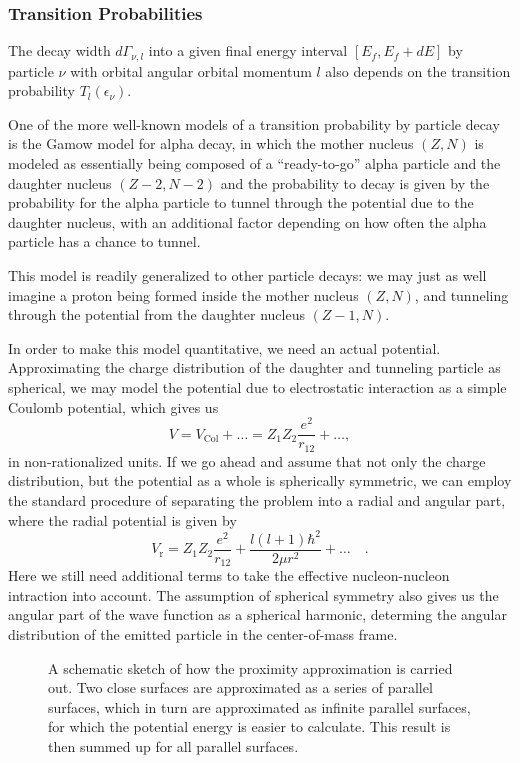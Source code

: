\subsubsection{Transition Probabilities}
The decay width $d\Gamma_{\nu,l}$ into a given final energy interval $[E_f,E_f+dE]$ by particle $\nu$ with orbital angular orbital momentum $l$ also depends on the transition probability $T_l(\epsilon_\nu)$.

One of the more well-known models of a transition probability by particle decay is the Gamow model for alpha decay, in which the mother nucleus $(Z,N)$ is modeled as essentially being composed of a ``ready-to-go'' alpha particle and the daughter nucleus $(Z-2,N-2)$ and the probability to decay is given by the probability for the alpha particle to tunnel through the potential due to the daughter nucleus, with an additional factor depending on how often the alpha particle has a chance to tunnel. 

This model is readily generalized to other particle decays: we may just as well imagine a proton being formed inside the mother nucleus $(Z,N)$, and tunneling through the potential from the daughter nucleus $(Z-1,N)$.

In order to make this model quantitative, we need an actual potential. Approximating the charge distribution of the daughter and tunneling particle as spherical, we may model the potential due to electrostatic interaction as a simple Coulomb potential, which gives us
\begin{equation}
V = V_\text{Col} + \dots =  Z_1 Z_2 \frac{e^2}{r_{12}} + \dots,
\end{equation}
in non-rationalized units.
If we go ahead and assume that not only the charge distribution, but the potential as a whole is spherically symmetric, we can employ the standard procedure of separating the problem into a radial and angular part, where the radial potential is given by
\begin{equation}
V_\text{r} = Z_1 Z_2 \frac{e^2}{r_{12}} + \frac{l(l+1)\hbar^2}{2\mu r^2} + \dots\quad .
\end{equation}
Here we still need additional terms to take the effective nucleon-nucleon intraction into account. The assumption of spherical symmetry also gives us the angular part of the wave function as a spherical harmonic, determing the angular distribution of the emitted particle in the center-of-mass frame.

\begin{figure}
\begin{center}

\caption{\label{fig:prox} A schematic sketch of how the proximity approximation is carried out. Two close surfaces are approximated as a series of parallel surfaces, which in turn are approximated as infinite parallel surfaces, for which the potential energy is easier to calculate. This result is then summed up for all parallel surfaces.}
\end{center}
\end{figure}

